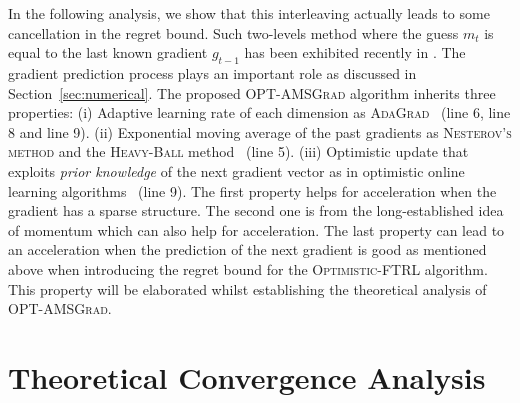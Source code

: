 \documentclass[wcp]{jmlr}
\begin{document}
In the following analysis, we show that this interleaving actually leads to some cancellation in the regret bound.
Such two-levels method where the guess $m_t$ is equal to the last known gradient $g_{t-1}$ has been exhibited recently in \citep{CJ12}.
The gradient prediction process plays an important role as discussed in Section~\ref{sec:numerical}.
The proposed \textsc{OPT-AMSGrad} algorithm inherits three properties: \textsf{(i)} Adaptive learning rate of each dimension as \textsc{AdaGrad}~\citep{DHS11} (line 6, line 8 and line 9). \textsf{(ii)} Exponential moving average of the past gradients as \textsc{Nesterov's method} \citep{N04} and the \textsc{Heavy-Ball} method~\citep{P64} (line 5). \textsf{(iii)} Optimistic update that exploits \emph{prior knowledge} of the next gradient vector as in optimistic online learning algorithms~\citep{CJ12,RS13b,SALS15} (line 9).
The first property helps for acceleration when the gradient has a sparse structure.
The second one is from the long-established idea of momentum which can also help for acceleration. 
The last property can lead to an acceleration when the prediction of the next gradient is good as mentioned above when introducing the regret bound for the \textsc{Optimistic-FTRL} algorithm.
This property will be elaborated whilst establishing the theoretical analysis of \textsc{OPT-AMSGrad}.




\vspace{-0.05in}
\section{Theoretical Convergence Analysis}\label{sec:analysis}
\vspace{-0.05in}
\end{document}
